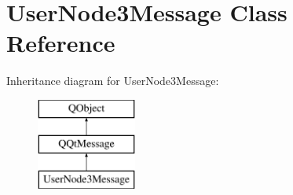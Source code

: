 \hypertarget{class_user_node3_message}{}\section{User\+Node3\+Message Class Reference}
\label{class_user_node3_message}
Inheritance diagram for User\+Node3\+Message\+:\begin{figure}[H]
\begin{center}
\leavevmode
\includegraphics[height=3.000000cm]{class_user_node3_message}
\end{center}
\end{figure}
